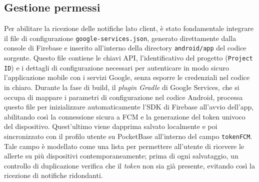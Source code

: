 \documentclass[12pt,a4paper]{article}
\begin{document}
\subsection{Gestione permessi}

Per abilitare la ricezione delle notifiche lato client, 
è stato fondamentale integrare 
il file di configurazione \texttt{google-services.json}, 
generato direttamente dalla console di Firebase 
e inserito all'interno della directory \texttt{android/app} del codice sorgente.
Questo file contiene le chiavi API, l'identificativo del progetto (\texttt{Project ID}) 
e i dettagli di configurazione necessari per autenticare in modo sicuro 
l'applicazione mobile con i servizi Google, 
senza esporre le credenziali nel codice in chiaro. 
Durante la fase di build, il \textit{plugin Gradle} di Google Services,
che si occupa di mappare i parametri di configurazione nel codice Android,
processa questo file per inizializzare automaticamente 
l'SDK di Firebase all'avvio dell'app,
abilitando così la connessione sicura a FCM 
e la generazione del token univoco del dispositivo.
Quest'ultimo viene dapprima salvato localmente 
e poi sincronizzato con il profilo utente su PocketBase 
all'interno del campo \texttt{tokenFCM}. 
Tale campo è modellato come una lista 
per permettere all'utente di ricevere le allerte 
su più dispositivi contemporaneamente; 
prima di ogni salvataggio, un controllo di duplicazione 
verifica che il \textit{token} non sia già presente, 
evitando così la ricezione di notifiche ridondanti.
\end{document}
